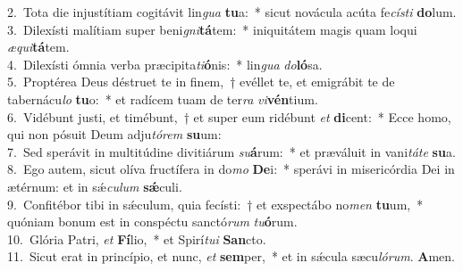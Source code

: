 {2.~}Tota die injustítiam cogitávit lin\textit{gua} \textbf{tu}a:~* sicut novácula acúta fe\textit{cí}\textit{sti} \textbf{do}lum.\\
{3.~}Dilexísti malítiam super beni\textit{gni}\textbf{tá}tem:~* iniquitátem magis quam loqui \textit{æ}\textit{qui}\textbf{tá}tem.\\
{4.~}Dilexísti ómnia verba præcipita\textit{ti}\textbf{ó}nis:~* lin\textit{gua} \textit{do}\textbf{ló}sa.\\
{5.~}Proptérea Deus déstruet te in finem,~† evéllet te, et emigrábit te de tabernácu\textit{lo} \textbf{tu}o:~* et radícem tuam de ter\textit{ra} \textit{vi}\textbf{vén}tium.\\
{6.~}Vidébunt justi, et timébunt,~† et super eum ridébunt \textit{et} \textbf{di}cent:~* Ecce homo, qui non pósuit Deum adju\textit{tó}\textit{rem} \textbf{su}um:\\
{7.~}Sed sperávit in multitúdine divitiárum \textit{su}\textbf{á}rum:~* et præváluit in vani\textit{tá}\textit{te} \textbf{su}a.\\
{8.~}Ego autem, sicut olíva fructífera in do\textit{mo} \textbf{De}i:~* sperávi in misericórdia Dei in ætérnum: et in sǽ\textit{cu}\textit{lum} \textbf{sǽ}culi.\\
{9.~}Confitébor tibi in sǽculum, quia fecísti:~† et exspectábo no\textit{men} \textbf{tu}um,~* quóniam bonum est in conspéctu sanctó\textit{rum} \textit{tu}\textbf{ó}rum.\\
{10.~}Glória Patri, \textit{et} \textbf{Fí}lio,~* et Spirí\textit{tu}\textit{i} \textbf{San}cto.\\
{11.~}Sicut erat in princípio, et nunc, \textit{et} \textbf{sem}per,~* et in sǽcula sæcu\textit{ló}\textit{rum}. \textbf{A}men.\\
